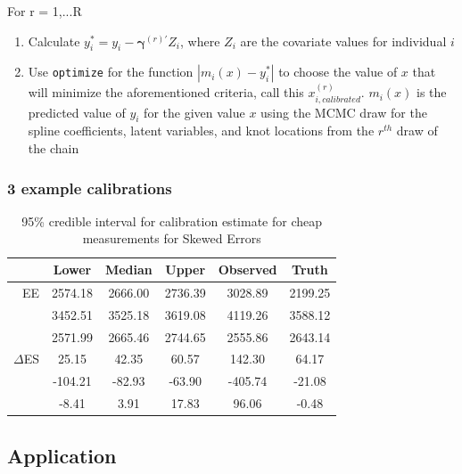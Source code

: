 \documentclass[handout]{beamer}\usepackage[]{graphicx}\usepackage[]{color}
\begin{document}
\begin{frame}

For r = 1,...R
\begin{enumerate}
\item
Calculate $y_i^* = y_i- \boldsymbol{\gamma}^{(r)'} Z_i$, where $Z_i$ are the covariate values for individual $i$
\item
Use \texttt{optimize} for the function $|m_i(x) - y_i^*|$ to choose the value of $x$ that will minimize the aforementioned criteria, call this $x_{i,calibrated}^{(r)}$. $m_i(x)$ is the predicted value of $y_i$ for the given value $x$ using the MCMC draw for the spline coefficients, latent variables, and knot locations from the $r^{th}$ draw of the chain

\end{enumerate}


\end{frame}

\begin{frame}
\frametitle{3 example calibrations}

\begin{table}[ht]
\centering
\begin{tabular}{r|ccc|cc}
  \hline
& Lower & Median & Upper & Observed & Truth \\ 
  \hline
EE & 2574.18 & 2666.00 & 2736.39 & 3028.89 & 2199.25 \\ 
  & 3452.51 & 3525.18 & 3619.08 & 4119.26 & 3588.12 \\ 
  & 2571.99 & 2665.46 & 2744.65 & 2555.86 & 2643.14 \\ 
   \hline  
   $\Delta$ES & 25.15 & 42.35 & 60.57 & 142.30 & 64.17 \\ 
  & -104.21 & -82.93 & -63.90 & -405.74 & -21.08 \\ 
  & -8.41 & 3.91 & 17.83 & 96.06 & -0.48 \\ 
   \hline
\end{tabular}
\caption{95\% credible interval for calibration estimate for cheap measurements for Skewed Errors} 
\label{calibratedee}
\end{table}

\end{frame}

\subsection{Application}
\end{document}
